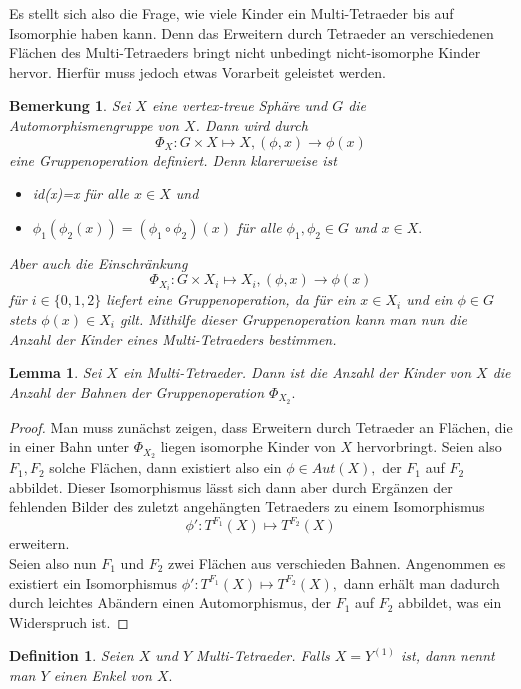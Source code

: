\documentclass[12pt,titlepage,twoside,cleardoublepage]{article}
\theoremstyle{nummermitklammern}
\newtheorem{lemma}[temp]{Lemma}
\newtheorem{definition}[temp]{Definition}
\newtheorem{bemerkung}[temp]{Bemerkung}
\newtheorem{definition}[zahl]{Definition}
\newtheorem{lemma}[zahl]{Lemma}
\newtheorem{bemerkung}[zahl]{Bemerkung}
\numberwithin{equation}{section}
\begin{document}
Es stellt sich also die Frage, wie viele Kinder ein Multi-Tetraeder bis auf Isomorphie haben kann. Denn das Erweitern durch Tetraeder an verschiedenen Flächen des Multi-Tetraeders bringt nicht unbedingt nicht-isomorphe Kinder hervor. Hierfür muss jedoch etwas Vorarbeit geleistet werden.
\begin{bemerkung} 
Sei $X$ eine vertex-treue Sphäre und $G$ die Automorphismengruppe von $X$. Dann wird durch 
\[
\Phi_X:G \times X\mapsto X,(\phi, x)\to \phi(x)
\] eine Gruppenoperation definiert. Denn klarerweise ist
\begin{itemize}
\item id(x)=x für alle $x\in X$ und
\item $\phi_1(\phi_2 (x))=(\phi_1 \circ\phi_2)(x)$ für alle $\phi_1,\phi_2 \in G$ und $x\in X.$
\end{itemize}
Aber auch die Einschränkung   
\[
\Phi_{X_i}:G \times X_i\mapsto X_i,(\phi, x)\to \phi(x)
\] für $i\in \{0,1,2\}$ liefert eine Gruppenoperation, da für ein $x\in X_i$ und ein $\phi\in G$ stets $\phi(x)\in X_i$ gilt. Mithilfe dieser Gruppenoperation kann man nun die Anzahl der Kinder eines Multi-Tetraeders bestimmen.
\end{bemerkung} 
\begin{lemma}
Sei $X$ ein Multi-Tetraeder. Dann ist die Anzahl der Kinder von $X$ die Anzahl der Bahnen der Gruppenoperation $\Phi_{X_2}.$
\end{lemma}
\begin{proof}
Man muss zunächst zeigen, dass Erweitern durch Tetraeder an Flächen, die in einer Bahn unter $\Phi_{X_2}$ liegen isomorphe Kinder von $X$ hervorbringt. Seien also $F_1,F_2$ solche Flächen, dann existiert also ein $\phi \in Aut(X),$ der $F_1$ auf $F_2$ abbildet. Dieser Isomorphismus lässt sich dann aber durch Ergänzen der fehlenden Bilder des zuletzt angehängten Tetraeders zu einem Isomorphismus 
\[
\phi':T^{F_1}(X)\mapsto T^{F_2}(X)
\]
 erweitern. \\
 Seien also nun $F_1$ und $F_2$ zwei Flächen aus verschieden Bahnen. Angenommen es existiert ein Isomorphismus $\phi':T^{F_1}(X)\mapsto T^{F_2}(X),$ dann erhält man dadurch durch leichtes Abändern einen Automorphismus, der $F_1$ auf $F_2$ abbildet, was ein Widerspruch ist. 
\end{proof}
\begin{definition}
Seien $X$ und $Y$ Multi-Tetraeder. Falls $X=Y^{(1)}$ ist, dann nennt man $Y$ einen \emph{Enkel}  von $X.$ 
\end{definition}
\end{document}
